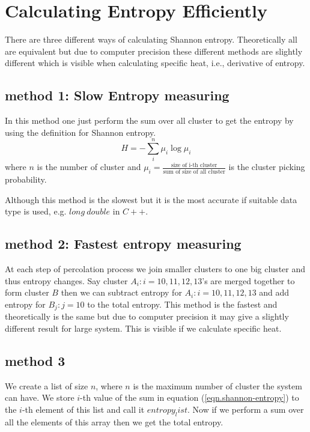\section{Calculating Entropy Efficiently}
	There are three different ways of calculating Shannon entropy. Theoretically all are equivalent but due to computer precision these different methods are slightly different which is visible when calculating specific heat, i.e., derivative of entropy.
	\subsection{method 1: Slow Entropy measuring}
	In this method one just perform the sum over all cluster to get the entropy by using the definition for Shannon entropy.
	\begin{equation}
		H = - \sum_{i}^{n} \mu_i \log \mu_i
		\label{eqn.shannon-entropy}
	\end{equation}
	where $n$ is the number of cluster and $\mu_i = \frac{\text{size of i-th cluster}}{\text{sum of size of all cluster}}$ is the cluster picking probability.
	
	Although this method is the slowest but it is the most accurate if suitable data type is used, e.g. $long\ double$ in $C++$.
	
	\subsection{method 2: Fastest entropy measuring}
	At each step of percolation process we join smaller clusters to one big cluster and thus entropy changes. Say cluster $A_i : i={10,11,12,13}$'s are merged together to form cluster $B$ then we can subtract entropy for $A_i : i={10,11,12,13}$ and add entropy for $B_j : j = {10}$ to the total entropy. This method is the fastest and theoretically is the same but due to computer precision it may give a slightly different result for large system. This is visible if we calculate specific heat.
	
	\subsection{method 3}
	We create a list of size $n$, where $n$ is the maximum number of cluster the system can have. We store $i$-th value of the sum in equation (\ref{eqn.shannon-entropy}) to the $i$-th element of this list and call it $entropy_list$. 
	Now if we perform a sum over all the elements of this array then we get the total entropy.
	
